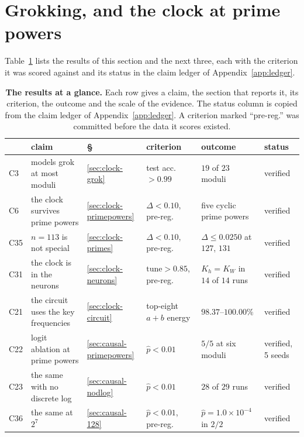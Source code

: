 \section{Grokking, and the clock at prime powers}
\label{sec:clock}

Table~\ref{tab:glance} lists the results of this section and the next three, each with the
criterion it was scored against and its status in the claim ledger of
Appendix~\ref{app:ledger}.

\begin{table}[t]
  \centering
  \footnotesize
  \caption{\textbf{The results at a glance.} Each row gives a claim, the section that
    reports it, its criterion, the outcome and the scale of the evidence. The status column
    is copied from the claim ledger of Appendix~\ref{app:ledger}. A criterion marked
    ``pre-reg.'' was committed before the data it scores existed.}
  \label{tab:glance}
  \setlength{\tabcolsep}{4pt}
  \begin{tabular}{l p{} l p{} p{} l}
    \toprule
    & claim & \S & criterion & outcome & status \\
    \midrule
    C3 & models grok at most moduli & \ref{sec:clock-grok} & test acc.\ $> 0.99$ & $19$ of $23$ moduli & verified \\
    C6 & the clock survives prime powers & \ref{sec:clock-primepowers} & $\Delta < 0.10$, pre-reg. & five cyclic prime powers & verified \\
    C35 & $n = 113$ is not special & \ref{sec:clock-primes} & $\Delta < 0.10$, pre-reg. & $\Delta \le 0.0250$ at $127$, $131$ & verified \\
    C31 & the clock is in the neurons & \ref{sec:clock-neurons} & $\mathrm{tune} > 0.85$, pre-reg. & $K_{h} = K_{W}$ in $14$ of $14$ runs & verified \\
    C21 & the circuit uses the key frequencies & \ref{sec:clock-circuit} & top-eight $a+b$ energy & $98.37$--$100.00\%$ & verified \\
    C22 & logit ablation at prime powers & \ref{sec:causal-primepowers} & $\hat{p} < 0.01$ & $5/5$ at six moduli & verified, 5 seeds \\
    C23 & the same with no discrete log & \ref{sec:causal-nodlog} & $\hat{p} < 0.01$ & $28$ of $29$ runs & verified \\
    C36 & the same at $2^{7}$ & \ref{sec:causal-128} & $\hat{p} < 0.01$, pre-reg. & $\hat{p} = 1.0 \times 10^{-4}$ in $2/2$ & verified \\

\end{tabular}
\end{table}
